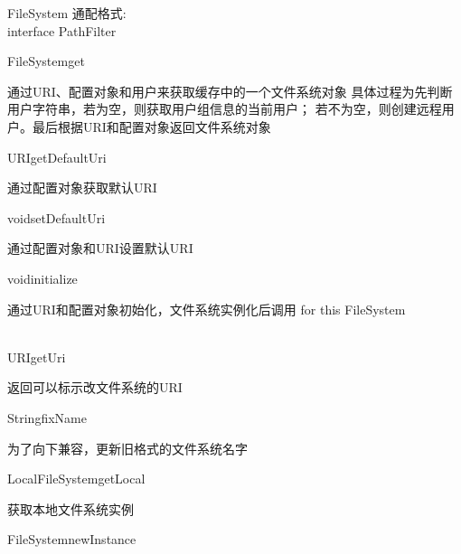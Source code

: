 \begin{XeClass}{FileSystem}
 通配格式: \\
 interface PathFilter

    \begin{XeMethod}{\XePublic}{FileSystem}{get}
         
 通过URI、配置对象和用户来获取缓存中的一个文件系统对象
 具体过程为先判断用户字符串，若为空，则获取用户组信息的当前用户；
 若不为空，则创建远程用户。最后根据URI和配置对象返回文件系统对象

    \end{XeMethod}

    \begin{XeMethod}{\XePublic}{URI}{getDefaultUri}
         
 通过配置对象获取默认URI

    \end{XeMethod}

    \begin{XeMethod}{\XePublic}{void}{setDefaultUri}
         
 通过配置对象和URI设置默认URI

    \end{XeMethod}

    \begin{XeMethod}{\XePublic}{void}{initialize}
         
 通过URI和配置对象初始化，文件系统实例化后调用
 for this FileSystem

    \end{XeMethod}

    \begin{XeMethod}{\XePublic \\ \XeAbstract}{URI}{getUri}
         
 返回可以标示改文件系统的URI

    \end{XeMethod}

    \begin{XeMethod}{\XePrivate}{String}{fixName}
         
 为了向下兼容，更新旧格式的文件系统名字

    \end{XeMethod}

    \begin{XeMethod}{\XePublic}{LocalFileSystem}{getLocal}
         
 获取本地文件系统实例

    \end{XeMethod}

    \begin{XeMethod}{\XePublic}{FileSystem}{newInstance}
         

\end{XeMethod}
\end{XeClass}
